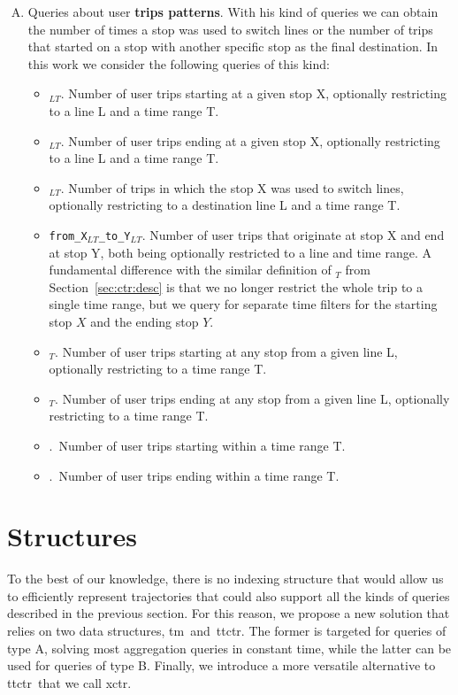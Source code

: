 \begin{enumerate}[A)]
        \item Queries about user \textbf{trips patterns}. With his kind of queries we can obtain the number of times a stop was used to switch lines or the number of trips that started on a stop with another specific stop as the final destination. In this work we consider the following queries of this kind:
        \begin{itemize}
            \item \startX$_{LT}$. Number of user trips starting at a given stop X, optionally restricting to a line L and a time range T.
            \item \endX$_{LT}$. Number of user trips ending at a given stop X, optionally restricting to a line L and a time range T.
            \item \switchX$_{LT}$. Number of trips in which the stop X was used to switch lines, optionally restricting to a destination line L and a time range T.
            \item \texttt{from\_X$_{LT}$\_to\_Y$_{LT}$}. Number of user trips that originate at stop X and end at stop Y, both being optionally restricted to a line and time range. A fundamental difference with the similar definition of \XtoY$_T$ from Section~\ref{sec:ctr:desc} is that we no longer restrict the whole trip to a single time range, but we query for separate time filters for the starting stop $X$ and the ending stop $Y$.
            \item \startL$_T$. Number of user trips starting at any stop from a given line L, optionally restricting to a time range T.
            \item \endL$_T$. Number of user trips ending at any stop from a given line L, optionally restricting to a time range T.
            \item \startT.~Number of user trips starting within a time range T.
            \item \endT.~Number of user trips ending within a time range T.
        \end{itemize}
    \end{enumerate}
	
\section{Structures}
\label{sec:newctr:str}
    To the best of our knowledge, there is no indexing structure that would allow us to efficiently represent trajectories that could also support all the kinds of queries described in the previous section. For this reason, we propose a new solution that relies on two data structures, \gls{tm}~and~\gls{ttctr}. The former is targeted for queries of type A, solving most aggregation queries in constant time, while the latter can be used for queries of type B. Finally, we introduce a more versatile alternative to \gls{ttctr}~that we call \gls{xctr}.
    
